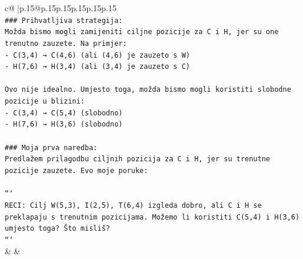\documentclass{article}
\begin{document}
{\begin{supertabular}{c@{$\;$}|p{.15\linewidth}@{}p{.15\linewidth}p{.15\linewidth}p{.15\linewidth}p{.15\linewidth}p{.15\linewidth}}
{{{\\ 
\texttt{\#\#\# Prihvatljiva strategija:} \\
\texttt{Možda bismo mogli zamijeniti ciljne pozicije za C i H, jer su one trenutno zauzete. Na primjer:} \\
\texttt{{-} C(3,4) → C(4,6) (ali (4,6) je zauzeto s W)} \\
\texttt{{-} H(7,6) → H(3,4) (ali (3,4) je zauzeto s C)} \\
\\ 
\texttt{Ovo nije idealno. Umjesto toga, možda bismo mogli koristiti slobodne pozicije u blizini:} \\
\texttt{{-} C(3,4) → C(5,4) (slobodno)} \\
\texttt{{-} H(7,6) → H(3,6) (slobodno)} \\
\\ 
\texttt{\#\#\# Moja prva naredba:} \\
\texttt{Predlažem prilagodbu ciljnih pozicija za C i H, jer su trenutne pozicije zauzete. Evo moje poruke:} \\
\\ 
\texttt{```} \\
\texttt{RECI: Cilj W(5,3), I(2,5), T(6,4) izgleda dobro, ali C i H se preklapaju s trenutnim pozicijama. Možemo li koristiti C(5,4) i H(3,6) umjesto toga? Što misliš?} \\
\texttt{```} \\
            }
        }
    }
    & & \\ \\


\end{supertabular}}
\end{document}

